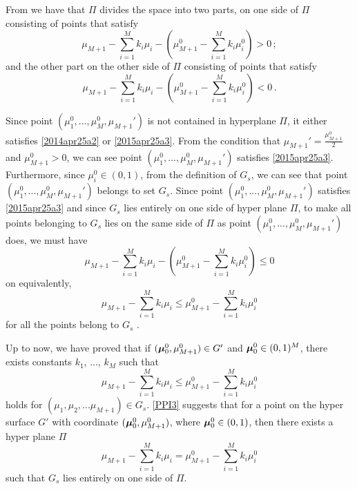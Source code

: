 From \cite{planeside} we have that $\Pi$ divides the space into two parts, on one side of $\Pi$ consisting of  points that satisfy
\begin{equation}
\mu_{M+1} - \sum_{i=1}^{M}k_i\mu_i - (\mu_{M+1}^0 - \sum_{i=1}^{M}k_i\mu_i^0) > 0\,;
\label{2014apr25a2}
\end{equation}
and the other part on the other side of $\Pi$ consisting of points that satisfy
\begin{equation}
\mu_{M+1} - \sum_{i=1}^{M}k_i\mu_i - (\mu_{M+1}^0 - \sum_{i=1}^{M}k_i\mu_i^0) < 0\,.
\label{2015apr25a3}
\end{equation}

Since point $(\mu_1^0, ..., \mu_M^0, \mu_{M+1}')$ is not contained in hyperplane $\Pi$, it either satisfies \eqref{2014apr25a2} or \eqref{2015apr25a3}. From the condition that $\mu_{M+1}' = \frac{\mu_{M+1}^0}{2}$ and $\mu_{M+1}^0 > 0$, we can see point  $(\mu_1^0, ..., \mu_M^0, \mu_{M+1}')$ satisfies \eqref{2015apr25a3}.  
Furthermore, since $\mu_i^0 \in (0, 1)$, from the definition of $G_s$, we can see that point $(\mu_1^0, ..., \mu_M^0, \mu_{M+1}')$ belongs to set $G_s$. 
Since point $(\mu_1^0, ..., \mu_M^0, \mu_{M+1}')$ satisfies \eqref{2015apr25a3} and since $G_s$ lies entirely on one side of hyper plane $\Pi$, to make all points belonging to $G_s$ lies on the same side of $\Pi$ as point $(\mu_1^0, ..., \mu_M^0, \mu_{M+1}')$ does, we must have
\begin{equation}
\mu_{M+1} - \sum_{i=1}^{M}k_i\mu_i -  ( \mu_{M+1}^0 - \sum_{i=1}^{M}k_i\mu_i^0) \leq 0
\label{PI3}
\end{equation}
on equivalently,
\[
\mu_{M+1} - \sum_{i=1}^{M}k_i\mu_i \leq   \mu_{M+1}^0 - \sum_{i=1}^{M}k_i\mu_i^0
\]
for all the points belong to $G_s$ \cite{dantzig1951fundamental, planeside}. 

Up to now, we have proved that if  $(\boldsymbol{\mu}_0^0, \mu_{M+1}^0) \in G'$ and $\boldsymbol{\mu}_0^0 \in (0, 1)^M$, there exists constants $k_1$, ..., $k_M$ such that
\begin{equation}
\mu_{M+1} - \sum_{i=1}^{M}k_i\mu_i \leq \mu_{M+1}^0 - \sum_{i=1}^{M}k_i\mu_i^0
\label{PPI3}
\end{equation}
holds for  $(\mu_1, \mu_2, ...\mu_{M+1}) \in G_s$. 
\eqref{PPI3} suggests that for a point on the hyper surface $G'$ with coordinate $(\boldsymbol{\mu}_0^0, \mu_{M+1}^0)$, where $\boldsymbol{\mu}_0^0 \in (0, 1)$, then there exists a hyper  plane $\Pi$ 
\[
\mu_{M+1} - \sum_{i=1}^{M}k_i\mu_i =  \mu_{M+1}^0 - \sum_{i=1}^{M}k_i\mu_i^0 
\]
such that $G_s$ lies entirely on one side of $\Pi$. 

